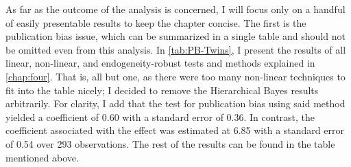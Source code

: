 As far as the outcome of the analysis is concerned, I will focus only on a handful of easily presentable results to keep the chapter concise.  The first is the publication bias issue, which can be summarized in a single table and should not be omitted even from this analysis. In \autoref{tab:PB-Twins}, I present the results of all linear, non-linear, and endogeneity-robust tests and methods explained in \autoref{chap:four}. That is, all but one, as there were too many non-linear techniques to fit into the table nicely; I decided to remove the Hierarchical Bayes results arbitrarily. For clarity, I add that the test for publication bias using said method yielded a coefficient of 0.60 with a standard error of 0.36. In contrast, the coefficient associated with the effect was estimated at 6.85 with a standard error of 0.54 over 293 observations. The rest of the results can be found in the table mentioned above.

